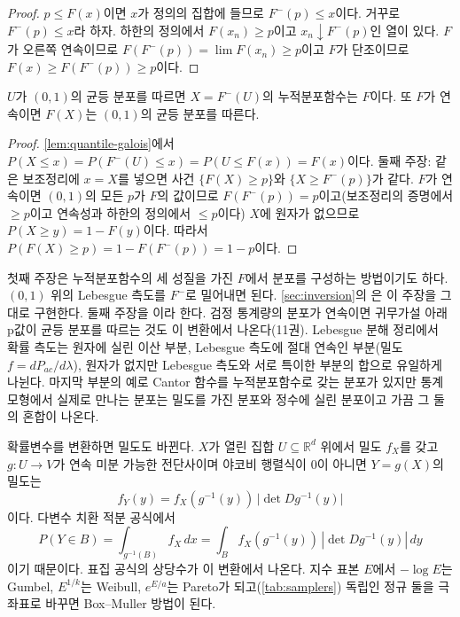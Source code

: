 \begin{proof}
$p\le F(x)$이면 $x$가 정의의 집합에 들므로 $F^{-}(p)\le x$이다. 거꾸로 $F^{-}(p)\le x$라 하자. 하한의 정의에서 $F(x_n)\ge p$이고 $x_n\downarrow F^{-}(p)$인 열이 있다. $F$가 오른쪽 연속이므로 $F(F^{-}(p))=\lim F(x_n)\ge p$이고 $F$가 단조이므로 $F(x)\ge F(F^{-}(p))\ge p$이다.
\end{proof}

\begin{theorem}[역변환과 확률 적분 변환]
\label{thm:inverse-transform}
$U$가 $(0,1)$의 균등 분포를 따르면 $X=F^{-}(U)$의 누적분포함수는 $F$이다. 또 $F$가 연속이면 $F(X)$는 $(0,1)$의 균등 분포를 따른다.
\end{theorem}

\begin{proof}
\cref{lem:quantile-galois}에서 $P(X\le x)=P(F^{-}(U)\le x)=P(U\le F(x))=F(x)$이다. 둘째 주장: 같은 보조정리에 $x=X$를 넣으면 사건 $\{F(X)\ge p\}$와 $\{X\ge F^{-}(p)\}$가 같다. $F$가 연속이면 $(0,1)$의 모든 $p$가 $F$의 값이므로 $F(F^{-}(p))=p$이고(보조정리의 증명에서 $\ge p$이고 연속성과 하한의 정의에서 $\le p$이다) $X$에 원자가 없으므로 $P(X\ge y)=1-F(y)$이다. 따라서 $P(F(X)\ge p)=1-F(F^{-}(p))=1-p$이다.
\end{proof}

첫째 주장은 누적분포함수의 세 성질을 가진 $F$에서 분포를 구성하는 방법이기도 하다. $(0,1)$ 위의 Lebesgue 측도를 $F^{-}$로 밀어내면 된다. \cref{sec:inversion}의 은 이 주장을 그대로 구현한다. 둘째 주장을 이라 한다. 검정 통계량의 분포가 연속이면 귀무가설 아래 p값이 균등 분포를 따르는 것도 이 변환에서 나온다(11권). Lebesgue 분해 정리에서 확률 측도는 원자에 실린 이산 부분, Lebesgue 측도에 절대 연속인 부분(밀도 $f=dP_{ac}/d\lambda$), 원자가 없지만 Lebesgue 측도와 서로 특이한 부분의 합으로 유일하게 나뉜다. 마지막 부분의 예로 Cantor 함수를 누적분포함수로 갖는 분포가 있지만 통계 모형에서 실제로 만나는 분포는 밀도를 가진 분포와 정수에 실린 분포이고 가끔 그 둘의 혼합이 나온다.

확률변수를 변환하면 밀도도 바뀐다. $X$가 열린 집합 $U\subseteq\mathbb R^d$ 위에서 밀도 $f_X$를 갖고 $g:U\to V$가 연속 미분 가능한 전단사이며 야코비 행렬식이 $0$이 아니면 $Y=g(X)$의 밀도는
\[
f_Y(y)=f_X(g^{-1}(y))\,\bigl|\det Dg^{-1}(y)\bigr|
\]
이다. 다변수 치환 적분 공식에서
\[
P(Y\in B)=\int_{g^{-1}(B)}f_X\,dx=\int_Bf_X(g^{-1}(y))\,|\det Dg^{-1}(y)|\,dy
\]
이기 때문이다. 표집 공식의 상당수가 이 변환에서 나온다. 지수 표본 $E$에서 $-\log E$는 Gumbel, $E^{1/k}$는 Weibull, $e^{E/a}$는 Pareto가 되고(\cref{tab:samplers}) 독립인 정규 둘을 극좌표로 바꾸면 Box--Muller 방법이 된다.

